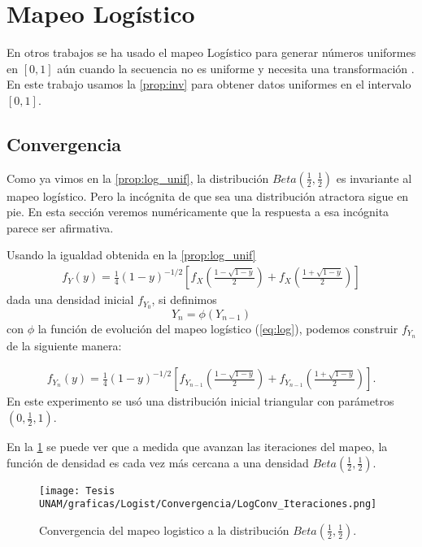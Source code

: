\documentclass[../Main.tex]{subfiles}
\begin{document}
\section{Mapeo Logístico}

En otros trabajos se ha usado el mapeo Logístico para generar números uniformes en $[0,1]$ aún cuando la secuencia no es uniforme y necesita una transformación \cite{Phatak1993}. En este trabajo usamos la \cref{prop:inv} para obtener datos uniformes en el intervalo $[0,1]$. 
\subsection{Convergencia}

Como ya vimos en la \cref{prop:log_unif}, la distribución $Beta(\frac{1}{2},\frac{1}{2})$ es invariante al mapeo logístico. Pero la incógnita de que sea una distribución atractora sigue en pie. En esta sección veremos numéricamente que la respuesta a esa incógnita parece ser afirmativa. 

Usando la igualdad obtenida en la \cref{prop:log_unif}
\begin{align*}
f_Y(y) =\frac{1}{4} (1 - y)^{-1/2} \left[ f_X\left( \frac{1 - \sqrt{1 - y}}{2} \right) + f_X\left( \frac{1 + \sqrt{1 - y}}{2} \right) \right] 
\end{align*}
dada una densidad inicial $f_{Y_{0}}$,  si definimos $$Y_n = \phi(Y_{n-1})$$ con $\phi$ la función de evolución del mapeo logístico (\ref{eq:log}), podemos construir $f_{Y{_n}}$ de la siguiente manera:

\begin{align*}
f_{Y_n}(y) =\frac{1}{4} (1 - y)^{-1/2} \left[ f_{Y_{n-1}}\left( \frac{1 - \sqrt{1 - y}}{2} \right) + f_{Y_{n-1}}\left( \frac{1 + \sqrt{1 - y}}{2} \right) \right].
\end{align*}
En este experimento se usó una distribución inicial triangular con parámetros $(0,\frac{1}{2},1)$.

En la \cref{fig:log_conv} se puede ver que a medida que avanzan las iteraciones del mapeo, la función de densidad es cada vez más cercana a una densidad $Beta(\frac{1}{2},\frac{1}{2})$.

\begin{figure}[h]
    \centering
    \texttt{[image: Tesis UNAM/graficas/Logist/Convergencia/LogConv\_Iteraciones.png]}
    \caption{Convergencia del mapeo logistico a la distribución $Beta(\frac{1}{2},\frac{1}{2})$.}
    \label{fig:log_conv}
\end{figure} 
\end{document}
